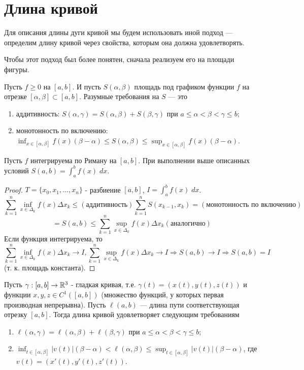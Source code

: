    \section{Длина кривой}
    
    Для описания длины дуги кривой мы будем использовать иной подход — определим длину кривой через свойства, которым она должна удовлетворять.
    
    Чтобы этот подход был более понятен, сначала реализуем его на площади фигуры.
    
    Пусть $f \geqslant 0$ на $[a, b]$. И пусть $S(\alpha, \beta)$ площадь под графиком функции $f$ на отрезке $[\alpha, \beta] \subset [a, b]$. Разумные требования на $S$ — это
    \begin{enumerate}
    	\item аддитивность: $S(\alpha, \gamma) = S(\alpha, \beta) + S(\beta, \gamma)$ при $a \leqslant \alpha < \beta < \gamma \leqslant b$;
    	\item монотонность по включению: $\displaystyle \inf_{x \in [\alpha, \beta]} f(x) (\beta - \alpha) \leqslant S(\alpha, \beta) \leqslant \sup_{x \in [\alpha, \beta]} f(x) (\beta - \alpha).$
    \end{enumerate}
    
    \begin{sentence}
    	Пусть $f$ интегрируема по Риману на $[a, b]$. При выполнении выше описанных условий $S(a, b) = \int_a^b f(x) \; dx$.
    \end{sentence}
    
    \begin{proof}
    	$T = \{x_0, x_1, ..., x_n\}$ - разбиение $[a, b]$, $I = \int_a^b f(x) \; dx$.
    	\[ \sum_{k = 1}^n \inf_{x \in \Delta_k} f(x) \Delta x_k \leqslant (\text{аддитивность}) \sum_{k = 1}^n S(x_{k - 1}, x_k) = (\text{монотонность по включению}) \]
    	\[ = S(a, b) \leqslant \sum_{k = 1}^n \sup_{x \in \Delta_k} f(x) \Delta x_k (\text{аналогично}) \]
    	Если функция интегрируема, то
    	\[ \sum_{k = 1}^n \inf_{x \in \Delta_k} f(x) \Delta x_k \to I, \sum_{k = 1}^n \sup_{x \in \Delta_k} f(x) \Delta x_k \to I \Rightarrow S(a, b) \to I \Rightarrow S(a, b) = I \]
    	(т. к. площадь константа).
    \end{proof}
    
    \begin{definition}
    	Пусть $\gamma : [a, b] \rightarrow \mathbb R^3$ - гладкая кривая, т.е. $\gamma(t) = (x(t), y(t), z(t))$ и функции $x, y, z \in C^1([a, b])$ (множество функций, у которых первая производная непрерывна). Пусть $\ell(a, b)$ — длина пути соответствующая отрезку $[a, b]$. Тогда длина кривой удовлетворяет следующим требованиям
        \begin{enumerate}
        	\item $\ell(\alpha, \gamma) = \ell(\alpha, \beta) + \ell(\beta, \gamma)$ при $a \leqslant \alpha < \beta < \gamma \leqslant b$;
        	\item $\displaystyle\inf_{t \in [\alpha, \beta]} |v(t)|(\beta - \alpha) < \ell(\alpha, \beta) \leqslant \sup_{t \in [\alpha, \beta]} |v(t)|(\beta - \alpha)$, где $v(t) = (x'(t), y'(t), z'(t))$.
        \end{enumerate}
    \end{definition}
    
